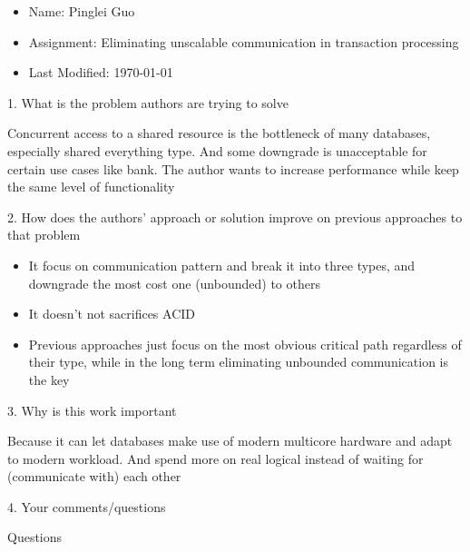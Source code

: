 \documentclass[12pt,a4paper,oneside]{article}
\begin{document}
\begin{itemize}
  \item Name: Pinglei Guo
  \item Assignment: Eliminating unscalable communication in transaction processing
  \item Last Modified: \today
\end{itemize}

1. What is the problem authors are trying to solve

\medskip

Concurrent access to a shared resource is the bottleneck of many databases, especially
shared everything type. And some downgrade is unacceptable for certain use cases like bank.
The author wants to increase performance while keep the same level of functionality

\bigskip

2. How does the authors’ approach or solution improve on previous approaches to that problem

\medskip

\begin{itemize}
  \item It focus on communication pattern and break it into three types, and downgrade the most
  cost one (unbounded) to others
  \item It doesn't not sacrifices ACID
  \item Previous approaches just focus on the most obvious critical path regardless of their type,
  while in the long term eliminating unbounded communication is the key
\end{itemize}

\bigskip

3. Why is this work important

\medskip

Because it can let databases make use of modern multicore hardware and adapt to modern workload.
And spend more on real logical instead of waiting for (communicate with) each other

\bigskip

4. Your comments/questions

\medskip

Questions
\end{document}

